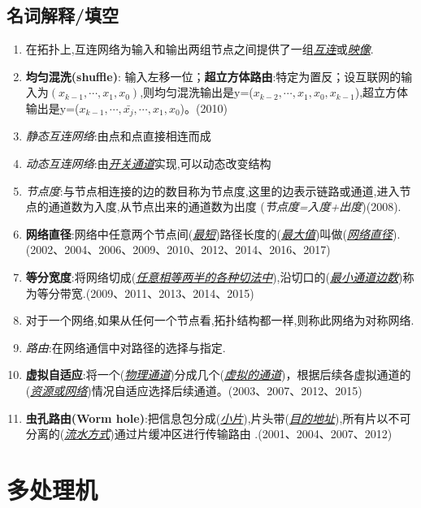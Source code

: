 \documentclass[a4paper]{ctexart}
\newcommand{\blank}[1]{(\emph{\underline{#1}})}
\begin{document}
\subsection{名词解释/填空}
\begin{enumerate}
  \item 在拓扑上,互连网络为输入和输出两组节点之间提供了一组\emph{\underline{互连}}或\emph{\underline{映像}}.
  \item \textbf{均匀混洗(shuffle)}: 输入左移一位；\textbf{超立方体路由}:特定为置反；设互联网的输入为$(x_{k-1},\cdots,x_1,x_0)$,则均匀混洗输出是y=\blank{$x_{k-2},\cdots,x_1,x_0,x_{k-1}$},超立方体输出是y=\blank{$x_{k-1},\cdots,\bar{x_j},\cdots,x_1,x_0$}。(2010)
  \item \emph{静态互连网络}:由点和点直接相连而成
  \item \emph{动态互连网络}:由\underline{\emph{开关通道}}实现,可以动态改变结构
  \item \emph{节点度}:与节点相连接的边的数目称为节点度,这里的边表示链路或通道,进入节点的通道数为入度,从节点出来的通道数为出度
  (\emph{节点度=入度+出度})(2008).
  \item \textbf{网络直径}:网络中任意两个节点间\blank{最短}路径长度的\blank{最大值}叫做(\emph{\underline{网络直径}}).(2002、2004、2006、2009、2010、2012、2014、2016、2017)
  \item \textbf{等分宽度}:将网络切成\blank{任意相等两半的各种切法中},沿切口的\blank{最小通道边数}称为等分带宽.(2009、2011、2013、2014、2015)
  \item 对于一个网络,如果从任何一个节点看,拓扑结构都一样,则称此网络为对称网络.
  \item \emph{路由}:在网络通信中对路径的选择与指定.
  \item \textbf{虚拟自适应}:将一个\blank{物理通道}分成几个\blank{虚拟的通道}，根据后续各虚拟通道的\blank{资源或网络}情况自适应选择后续通道。(2003、2007、2012、2015)
  \item \textbf{虫孔路由(Worm hole)}:把信息包分成(\emph{\underline{小片}}),片头带(\emph{\underline{目的地址}}),所有片以不可分离的(\emph{\underline{流水方式}})通过片缓冲区进行传输路由 .(2001、2004、2007、2012)
\end{enumerate}

\newpage
\section{多处理机}
\end{document}
